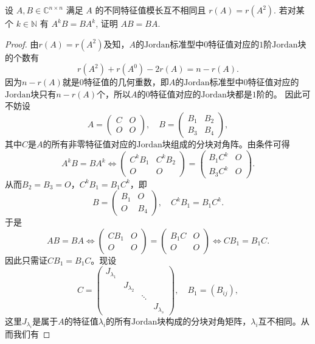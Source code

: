 \documentclass[../../main.tex]{subfiles}%
\begin{document}
\begin{example}
设 \( A,B \in \mathbb{C}^{n \times n} \) 满足 \( A \) 的不同特征值模长互不相同且 \( r(A) = r(A^2) \). 若对某个 \( k \in \mathbb{N} \) 有 \( A^k B = BA^k \), 证明 \( AB = BA \).
\end{example}
\begin{proof}
由$r(A) = r(A^2)$及知，$A$的$\text{Jordan}$标准型中$0$特征值对应的$1$阶$\text{Jordan}$块的个数有
\[
r(A^2) + r(A^0) - 2r(A) = n - r(A).
\]
因为$n - r(A)$就是$0$特征值的几何重数，即$A$的$\text{Jordan}$标准型中$0$特征值对应的$\text{Jordan}$块只有$n - r(A)$个，所以$A$的$0$特征值对应的$\text{Jordan}$块都是$1$阶的。
因此可不妨设
\[
A = \begin{pmatrix}
C & O \\
O & O
\end{pmatrix}, \quad B = \begin{pmatrix}
B_1 & B_2 \\
B_3 & B_4
\end{pmatrix},
\]
其中$C$是$A$的所有非零特征值对应的$\text{Jordan}$块组成的分块对角阵。由条件可得
\[
A^k B = B A^k \Longleftrightarrow \begin{pmatrix}
C^k B_1 & C^k B_2 \\
O & O
\end{pmatrix} = \begin{pmatrix}
B_1 C^k & O \\
B_3 C^k & O
\end{pmatrix}.
\]
从而$B_2 = B_3 = O$，$C^k B_1 = B_1 C^k$，即
\[
B = \begin{pmatrix}
B_1 & O \\
O & B_4
\end{pmatrix}, \quad C^k B_1 = B_1 C^k.
\]
于是
\[
A B = B A \Longleftrightarrow \begin{pmatrix}
C B_1 & O \\
O & O
\end{pmatrix} = \begin{pmatrix}
B_1 C & O \\
O & O
\end{pmatrix} \Longleftrightarrow C B_1 = B_1 C.
\]
因此只需证$C B_1 = B_1 C$。现设
\[
C = \begin{pmatrix}
J_{\lambda_1} & & & \\
& J_{\lambda_2} & & \\
& & \ddots & \\
& & & J_{\lambda_s}
\end{pmatrix}, \quad B_1 = (B_{ij}),
\]
这里$J_{\lambda_i}$是属于$A$的特征值$\lambda_i$的所有$\text{Jordan}$块构成的分块对角矩阵，$\lambda_i$互不相同。从而我们有

\end{proof}
\end{document}

